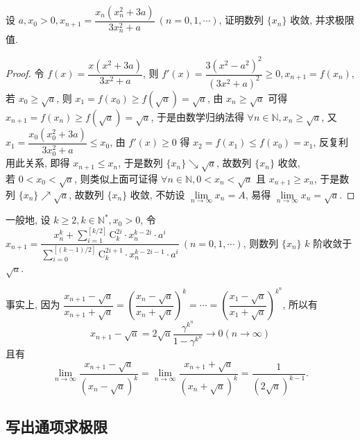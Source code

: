 \begin{example}
    设 $a,x_0>0,x_{n+1}=\dfrac{x_n\left(x_n^2+3a\right)}{3x_n^2+a}~  (n=0,1,\cdots)$, 证明数列 $\{x_n\}$ 收敛, 并求极限值.
\end{example}
\begin{proof}
    令 $f(x)=\dfrac{x(x^2+3a)}{3x^2+a}$, 则 $f'(x) =\dfrac{3\left( x^{2}-a^{2}\right) ^{2}}{\left( 3x^{2}+a\right) ^{2}}\geqslant 0,x_{n+1}=f(x_n)$, \\
    若 $x_0\geqslant \sqrt{a}$, 则 $x_1=f(x_0)\geqslant f\left(\sqrt a\right)=\sqrt{a}$, 由 $x_n\geqslant \sqrt{a}$ 可得 $x_{n+1}=f(x_n)\geqslant f\left(\sqrt{a}\right)=\sqrt{a}$, 
    于是由数学归纳法得 $\forall n\in\mathbb{N},x_n\geqslant\sqrt{a}$, 又 $x_1=\dfrac{x_0\left(x_0^2+3a\right)}{3x_0^2+a}\leqslant x_0$, 由 $f'(x)\geqslant 0$ 得 $x_2=f(x_1)\leqslant f(x_0)=x_1$, 反复利用此关系, 
    即得 $x_{n+1}\leqslant x_n$, 于是数列 $\{x_n\}\searrow\sqrt{a}$, 故数列 $\{x_n\}$ 收敛, \\
    若 $0<x_0<\sqrt{a}$, 则类似上面可证得 $\forall n\in\mathbb{N},0<x_n<\sqrt{a}$ 且 $x_{n+1}\geqslant x_{n}$, 于是数列 $\{x_n\}\nearrow\sqrt{a}$, 故数列 $\{x_n\}$ 收敛, 
    不妨设 $\lim\limits_{n\to\infty}x_n=A$, 易得 $\lim\limits_{n\to\infty}x_n=\sqrt{a}.$
\end{proof}
\begin{inference}
    一般地, 设 $k\geqslant 2,k\in\mathbb{N}^*,x_0>0$, 令 $x_{n+1}=\dfrac{\displaystyle x_{n}^{k}+\sum\limits ^{\left[ k/2\right] }_{i=1}\mathrm{C}_{k}^{2i}\cdot x_{n}^{k-2i}\cdot a^{i}}{\displaystyle\sum\limits ^{\left[ \left( k-1\right) /2\right] }_{i=0}\mathrm{C}_{k}^{2i+1}\cdot x_{n}^{k-2i-1}\cdot a^{i}}~  (n=0,1,\cdots)$, 
    则数列 $\{x_n\}$ $k$ 阶收敛于 $\sqrt{a}.$

    事实上, 因为 $\dfrac{x_{n+1}-\sqrt{a}}{x_{n+1}+\sqrt{a}}=\left( \dfrac{x_{n}-\sqrt{a}}{x_{n}+\sqrt{a}}\right) ^{k}=\cdots =\left( \dfrac{x_{1}-\sqrt{a}}{x_{1}+\sqrt{a}}\right) ^{k^{n}}$, 
    所以有 $$x_{n+1}-\sqrt{a}=2\sqrt{a}\dfrac{\gamma ^{k^{n}}}{1-\gamma ^{k^{n}}}\to 0\left( n\to \infty \right) $$
    且有
    $$\lim _{n\to \infty }\dfrac{x_{n+1}-\sqrt{a}}{\left( x_{n}-\sqrt{a}\right) ^{k}}=\lim _{n\to \infty }\dfrac{x_{n+1}+\sqrt{a}}{\left( x_{n}+\sqrt{a}\right) ^{k}}=\dfrac{1}{\left( 2\sqrt{a}\right) ^{k-1}}.$$
\end{inference}

\subsection{写出通项求极限}

